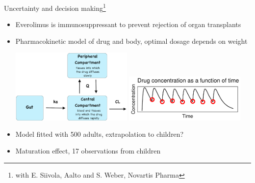 \documentclass[english,t]{beamer}
\begin{document}
\begin{frame}{Uncertainty and decision making\footnote{\color{gray}with E. Siivola, Aalto and S. Weber, Novartis Pharma}}

  \vspace{-0.5\baselineskip}
\begin{itemize}
\item Everolimus is immunosuppressant to prevent rejection of organ
  transplants
\item Pharmacokinetic model of drug and body, optimal dosage depends on weight\\
  \begin{minipage}[t]{\textwidth}
    \vspace{-.2\baselineskip}
  \hspace{-1.2cm}\includegraphics[width=6cm]{2compartment_graph.png}
  \includegraphics[width=6cm]{data_population_simple.pdf}
\end{minipage}
    \vspace{.2\baselineskip}
\item<2-> Model fitted with 500 adults, extrapolation to children?
\item<3-> Maturation effect, 17 observations from children
\end{itemize}

\end{frame}
\end{document}
